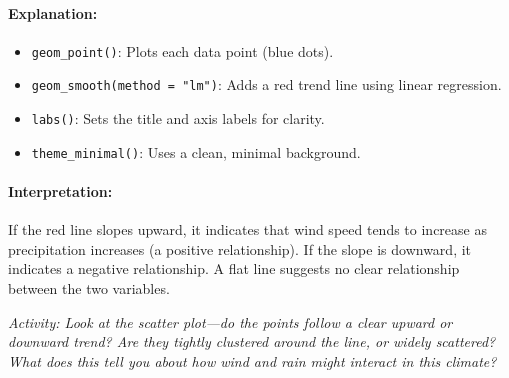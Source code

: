 \paragraph{Explanation:}
\begin{itemize}
    \item \texttt{geom\_point()}: Plots each data point (blue dots).
    \item \texttt{geom\_smooth(method = "lm")}: Adds a red trend line using linear regression.
    \item \texttt{labs()}: Sets the title and axis labels for clarity.
    \item \texttt{theme\_minimal()}: Uses a clean, minimal background.
\end{itemize}

\paragraph{Interpretation:} 

If the red line slopes upward, it indicates that wind speed tends to increase as precipitation increases (a positive relationship). If the slope is downward, it indicates a negative relationship. A flat line suggests no clear relationship between the two variables.

\textit{Activity: Look at the scatter plot—do the points follow a clear upward or downward trend? Are they tightly clustered around the line, or widely scattered? What does this tell you about how wind and rain might interact in this climate?}

